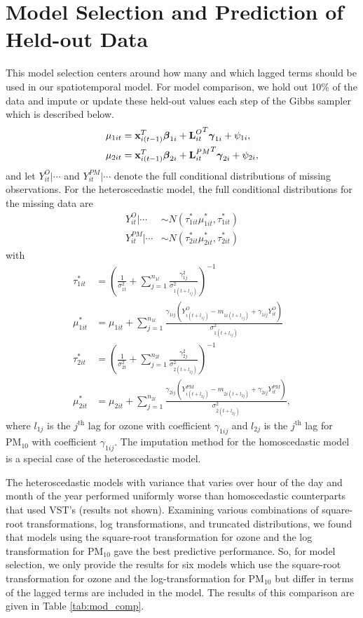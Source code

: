 \documentclass[alpha-refs]{wiley-article}
\newcommand{\bbeta}{ \mbox{\boldmath $ \beta $} }
\newcommand{\bgamma}{ \mbox{\boldmath $\gamma$} }
\newcommand{\bL}{\textbf{L}}
\newcommand{\bx}{\textbf{x}}
\begin{document}
\section{Model Selection and Prediction of Held-out Data}\label{app:full_cond_pred}

This model selection centers around how many and which lagged terms should be used in our spatiotemporal model. For model comparison, we hold out 10\% of the data and impute or update these held-out values each step of the Gibbs sampler which is described below.
\begin{align*}
\mu_{1it} &= \bx_{i(t-1)}^T \bbeta_{1i} + {\bL^{O}_{it}}^T\bgamma_{1i}+ \psi_{1i}, \\
\mu_{2it} &= \bx_{i(t-1)}^T \bbeta_{2i} + {\bL^{PM}_{it}}^T\bgamma_{2i}+ \psi_{2i},
\end{align*}
and let $Y^{O}_{it} | \cdots$ and $Y^{PM}_{it} | \cdots$ denote the full conditional distributions of missing observations. For the heteroscedastic model, the full conditional distributions for the missing data are
\begin{align*}
Y^{O}_{it} | \cdots &\sim N( \tau^*_{1it} \mu^*_{1it},\tau^*_{1it} ) \\
Y^{PM}_{it} | \cdots &\sim N( \tau^*_{2it} \mu^*_{2it},\tau^*_{2it} ) \nonumber
\end{align*}
with
\begin{align*}
\tau^*_{1it} &=  \left(\frac{1}{\sigma^2_{1t} } + \sum^{n_{1l}}_{j=1} \frac{\gamma_{1j}^2}{\sigma^2_{1(t+ l_{1j})}} \right)^{-1} \\
\mu^*_{1it} &= \mu_{1it} + \sum_{j=1}^{n_{ 1l } } \frac{ \gamma_{1ij} ( Y^{O}_{i(t + l_{1j} )} - m_{1i(t + l_{1j})} + \gamma_{1ij}  Y^{O}_{it} )}{ \sigma^2_{1(t+l_{1j})} }  \\
\tau^*_{2it} &= \left(\frac{1}{\sigma^2_{2t} } + \sum^{n_{2l}}_{j=1} \frac{\gamma_{2j}^2}{\sigma^2_{2(t+ l_{2j})}} \right)^{-1} \\
\mu^*_{2it} &= \mu_{2it} + \sum_{j=1}^{n_{ 2l } } \frac{ \gamma_{2ij} ( Y^{PM}_{i(t + l_{2j} )} - m_{2i(t + l_{2j} )} + \gamma_{2ij} Y^{PM}_{it} )}{ \sigma^2_{2(t+l_{2j} )} },
\end{align*}
where $l_{1j}$ is the $j^\text{th}$ lag for ozone with coefficient $\gamma_{1ij}$ and $l_{2j}$ is the $j^\text{th}$ lag for $\text{PM}_{10}$  with coefficient $\gamma_{1ij}$. The imputation method for the homoscedastic model is a special case of the heteroscedastic model.

The heteroscedastic models with variance that varies over hour of the day and month of the year performed uniformly worse than homoscedastic counterparts that used VST's (results not shown). Examining various combinations of square-root transformations, log transformations, and truncated distributions, we found that models using the square-root transformation for ozone and the log transformation for $\text{PM}_{10}$ gave the best predictive performance. So, for model selection, we only provide the results for six models which use the square-root transformation for ozone and the log-transformation for $\text{PM}_{10}$ but differ in terms of the lagged terms are included in the model. The results of this comparison are given in Table \ref{tab:mod_comp}.
\end{document}
